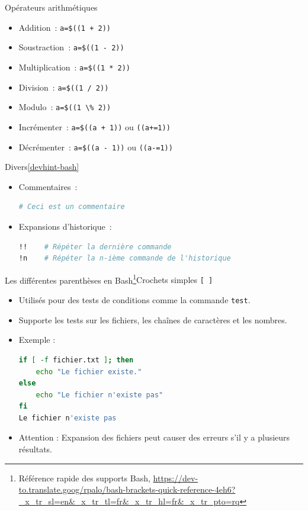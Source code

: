 \documentclass{beamer}
\begin{document}
    \begin{frame}[fragile]{Opérateurs arithmétiques}
        \begin{itemize}
            \item Addition~: \lstinline{a=$((1 + 2))}
            \item Soustraction~: \lstinline{a=$((1 - 2))}
            \item Multiplication~: \lstinline{a=$((1 * 2))}
            \item Division~: \lstinline{a=$((1 / 2))}
            \item Modulo~: \lstinline{a=$((1 \% 2))}
            \item Incrémenter~: \lstinline{a=$((a + 1))} ou \lstinline{((a+=1))}
            \item Décrémenter~: \lstinline{a=$((a - 1))} ou \lstinline{((a-=1))}
        \end{itemize}
    \end{frame}

    \begin{frame}[fragile]{Divers\cref{devhint-bash}}
        \begin{itemize}
            \item Commentaires~:
            \begin{lstlisting}[language=bash]
# Ceci est un commentaire
            \end{lstlisting}
            \item Expansions d'historique~:
            \begin{lstlisting}[language=bash]
!!    # Répéter la dernière commande
!n    # Répéter la n-ième commande de l'historique
            \end{lstlisting}
        \end{itemize}
    \end{frame}


    \begin{frame}[fragile]{Les différentes parenthèses en Bash\footnote{\label{penthesisbash}Référence rapide des supports Bash, \url{https://dev-to.translate.goog/rpalo/bash-brackets-quick-reference-4eh6?_x_tr_sl=en&_x_tr_tl=fr&_x_tr_hl=fr&_x_tr_pto=rq}}}{Crochets simples \texttt{[ ]}}
        \begin{itemize}
            \item Utilisés pour des tests de conditions comme la commande \lstinline{test}.
            \item Supporte les tests sur les fichiers, les chaînes de caractères et les nombres.
            \item Exemple :
            \begin{lstlisting}[language=bash]
if [ -f fichier.txt ]; then
    echo "Le fichier existe."
else
    echo "Le fichier n'existe pas"
fi
Le fichier n'existe pas
            \end{lstlisting}
            \item Attention : Expansion des fichiers peut causer des erreurs s'il y a plusieurs résultats.
        \end{itemize}
    \end{frame}
\end{document}
